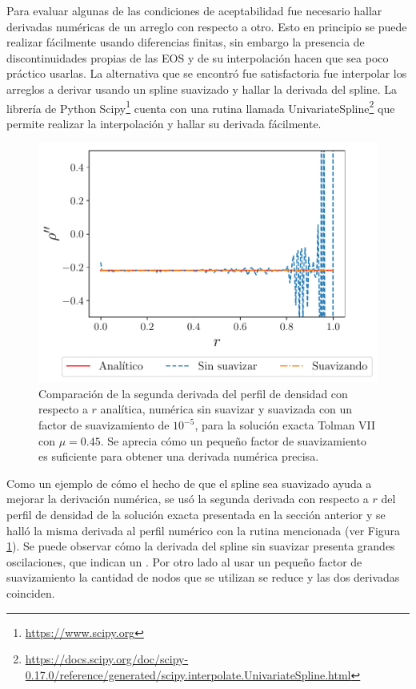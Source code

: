 \noindent Para evaluar algunas de las condiciones de aceptabilidad fue necesario hallar derivadas numéricas de un arreglo con respecto a otro. Esto en principio se puede realizar fácilmente usando diferencias finitas, sin embargo la presencia de discontinuidades propias de las EOS y de su interpolación hacen que sea poco práctico usarlas. La alternativa que se encontró fue satisfactoria fue interpolar los arreglos a derivar usando un spline suavizado y hallar la derivada del spline. La librería de Python Scipy\footnote{\url{https://www.scipy.org}} cuenta con una rutina llamada UnivariateSpline\footnote{\url{https://docs.scipy.org/doc/scipy-0.17.0/reference/generated/scipy.interpolate.UnivariateSpline.html}} que permite realizar la interpolación y hallar su derivada fácilmente.
\begin{figure}[H]
    \centering
    \includegraphics[width=0.7\linewidth]{figures/rhoppTolmanVIImu45.pdf}
    \caption[Comparación entre $\rho^{\prime\prime}$ para una solución exacta y lo obtenido numéricamente]{Comparación de la segunda derivada del perfil de densidad con respecto a $r$ analítica, numérica sin suavizar y suavizada con un factor de suavizamiento de $10^{-5}$, para la solución exacta Tolman VII con $\mu=0.45$. Se aprecia cómo un pequeño factor de suavizamiento es suficiente para obtener una derivada numérica precisa. }
    \label{numericald}
\end{figure}
Como un ejemplo de cómo el hecho de que el spline sea suavizado ayuda a mejorar la derivación numérica, se usó la segunda derivada con respecto a $r$ del perfil de densidad de la solución exacta presentada en la sección anterior y se halló la misma derivada al perfil numérico con la rutina mencionada (ver Figura \ref{numericald}). 
Se puede observar cómo la derivada del spline sin suavizar presenta grandes oscilaciones, que indican un . Por otro lado al usar un pequeño factor de suavizamiento la cantidad de nodos que se utilizan se reduce y las dos derivadas coinciden.
